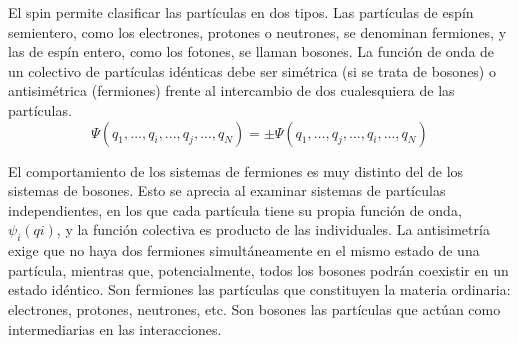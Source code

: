 El spin permite clasificar las partículas en dos tipos.
Las partículas de espín semientero, como los electrones,
protones o neutrones, 
se denominan fermiones, y las de espín entero, como los
fotones, se llaman bosones. La función de onda de un 
colectivo de partículas idénticas debe ser simétrica 
(si se trata de bosones) o antisimétrica (fermiones) 
frente al intercambio de dos cualesquiera de las partículas.
\begin{equation}
    \Psi(q_1, ..., q_i, ..., q_j, ..., q_N)=\pm 
    \Psi(q_1, ..., q_j, ..., q_i, ..., q_N)
\end{equation}

El comportamiento de los sistemas de fermiones es muy 
distinto del de los sistemas de bosones. Esto se aprecia
al examinar sistemas de partículas independientes, en los
que cada partícula tiene su propia función de onda,
$\psi_i(qi)$, y la función colectiva es producto de las
individuales. La antisimetría exige que no haya dos 
fermiones simultáneamente en el mismo estado de una 
partícula, mientras que, potencialmente, todos los bosones
podrán coexistir en un estado idéntico.
Son fermiones las partículas que constituyen la materia
ordinaria: electrones, protones, neutrones, etc. Son 
bosones las partículas que actúan como intermediarias 
en las interacciones.




